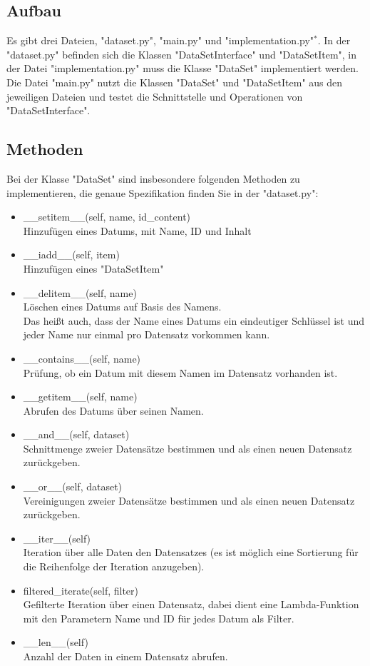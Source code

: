 \documentclass{article}
\begin{document}
		\subsection{Aufbau}
			Es gibt drei Dateien, "dataset.py", "main.py" und "implementation.py"$^*$.
			In der "dataset.py" befinden sich die Klassen "DataSetInterface" und "DataSetItem",
			in der Datei "implementation.py" muss die Klasse "DataSet" implementiert werden.
			Die Datei "main.py" nutzt die Klassen "DataSet" und "DataSetItem" aus den jeweiligen Dateien und testet die Schnittstelle und Operationen von "DataSetInterface".\\
	
		\subsection{Methoden}
			Bei der Klasse "DataSet" sind insbesondere folgenden Methoden zu implementieren, die genaue Spezifikation finden Sie in der "dataset.py":\\
			\begin{itemize}
				\item \_\_setitem\_\_(self, name, id\_content)\\
					Hinzufügen eines Datums, mit Name, ID und Inhalt
				\item \_\_iadd\_\_(self, item)\\
					Hinzufügen eines "DataSetItem"
				\item \_\_delitem\_\_(self, name)\\
					Löschen eines Datums auf Basis des Namens.\\
					Das heißt auch, dass der Name eines Datums ein eindeutiger Schlüssel ist und jeder Name nur einmal pro Datensatz vorkommen kann.
				\item \_\_contains\_\_(self, name)\\
					Prüfung, ob ein Datum mit diesem Namen im Datensatz vorhanden ist.
				\item \_\_getitem\_\_(self, name)\\
					Abrufen des Datums über seinen Namen.
				\item \_\_and\_\_(self, dataset)\\
					Schnittmenge zweier Datensätze bestimmen und als einen neuen Datensatz zurückgeben.
				\item \_\_or\_\_(self, dataset)\\
					Vereinigungen zweier Datensätze bestimmen und als einen neuen Datensatz zurückgeben.
				\item \_\_iter\_\_(self)\\
					Iteration über alle Daten den Datensatzes (es ist möglich eine Sortierung für die Reihenfolge der Iteration anzugeben).
				\item filtered\_iterate(self, filter)\\
					Gefilterte Iteration über einen Datensatz, dabei dient eine Lambda-Funktion mit den Parametern Name und ID für jedes Datum als Filter.
				\item \_\_len\_\_(self)\\
					Anzahl der Daten in einem Datensatz abrufen.\\
			\end{itemize}
	
\end{document}
